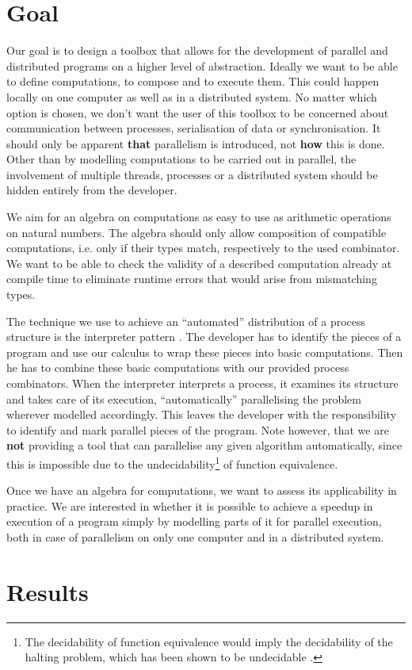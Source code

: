 \section{Goal}
\label{chp:goal}
Our goal is to design a toolbox that allows for the development of parallel and distributed programs on a higher level of abstraction. Ideally we want to be able to define computations, to compose and to execute them. This could happen locally on one computer as well as in a distributed system. No matter which option is chosen, we don't want the user of this toolbox to be concerned about communication between processes, serialisation of data or synchronisation. It should only be apparent \textbf{that} parallelism is introduced, not \textbf{how} this is done. Other than by modelling computations to be carried out in parallel, the involvement of multiple threads, processes or a distributed system should be hidden entirely from the developer.

We aim for an algebra on computations as easy to use as arithmetic operations on natural numbers. The algebra should only allow composition of compatible computations, i.e. only if their types match, respectively to the used combinator. We want to be able to check the validity of a described computation already at compile time to eliminate runtime errors that would arise from mismatching types.

The technique we use to achieve an \enquote{automated} distribution of a process structure is the interpreter pattern \cite{Gamma:1995:DPE:186897}. The developer has to identify the pieces of a program and use our calculus to wrap these pieces into basic computations. Then he has to combine these basic computations with our provided process combinators. When the interpreter interprets a process, it examines its structure and takes care of its execution, \enquote{automatically} parallelising the problem wherever modelled accordingly. This leaves the developer with the responsibility to identify and mark parallel pieces of the program. Note however, that we are \textbf{not} providing a tool that can parallelise any given algorithm automatically, since this is impossible due to the undecidability\footnote{The decidability of function equivalence would imply the decidability of the halting problem, which has been shown to be undecidable \citep{Garey:1979:CIG:578533}.} of function equivalence.

Once we have an algebra for computations, we want to assess its applicability in practice. We are interested in whether it is possible to achieve a speedup in execution of a program simply by modelling parts of it for parallel execution, both in case of parallelism on only one computer and in a distributed system.

\section{Results}
\lipsum[1-6]